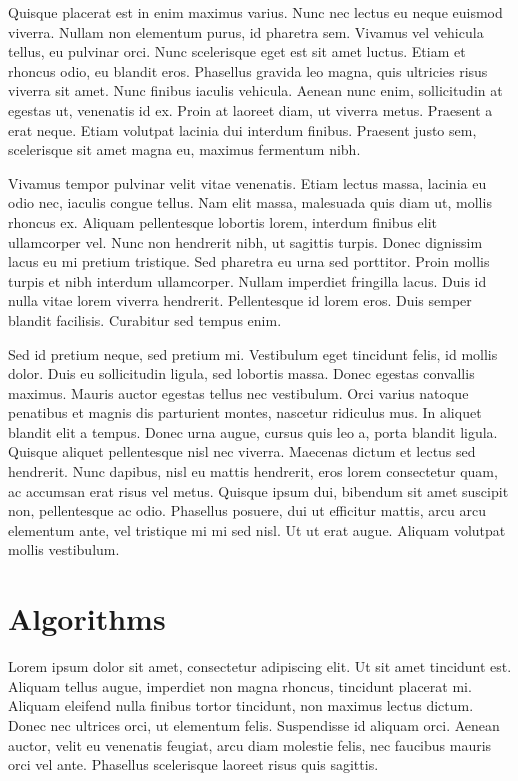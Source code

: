 \documentclass[conference]{IEEEtran}
\begin{document}
Quisque placerat est in enim maximus varius. Nunc nec lectus eu neque euismod viverra. Nullam non elementum purus, id pharetra sem. Vivamus vel vehicula tellus, eu pulvinar orci. Nunc scelerisque eget est sit amet luctus. Etiam et rhoncus odio, eu blandit eros. Phasellus gravida leo magna, quis ultricies risus viverra sit amet. Nunc finibus iaculis vehicula. Aenean nunc enim, sollicitudin at egestas ut, venenatis id ex. Proin at laoreet diam, ut viverra metus. Praesent a erat neque. Etiam volutpat lacinia dui interdum finibus. Praesent justo sem, scelerisque sit amet magna eu, maximus fermentum nibh.

Vivamus tempor pulvinar velit vitae venenatis. Etiam lectus massa, lacinia eu odio nec, iaculis congue tellus. Nam elit massa, malesuada quis diam ut, mollis rhoncus ex. Aliquam pellentesque lobortis lorem, interdum finibus elit ullamcorper vel. Nunc non hendrerit nibh, ut sagittis turpis. Donec dignissim lacus eu mi pretium tristique. Sed pharetra eu urna sed porttitor. Proin mollis turpis et nibh interdum ullamcorper. Nullam imperdiet fringilla lacus. Duis id nulla vitae lorem viverra hendrerit. Pellentesque id lorem eros. Duis semper blandit facilisis. Curabitur sed tempus enim.

Sed id pretium neque, sed pretium mi. Vestibulum eget tincidunt felis, id mollis dolor. Duis eu sollicitudin ligula, sed lobortis massa. Donec egestas convallis maximus. Mauris auctor egestas tellus nec vestibulum. Orci varius natoque penatibus et magnis dis parturient montes, nascetur ridiculus mus. In aliquet blandit elit a tempus. Donec urna augue, cursus quis leo a, porta blandit ligula. Quisque aliquet pellentesque nisl nec viverra. Maecenas dictum et lectus sed hendrerit. Nunc dapibus, nisl eu mattis hendrerit, eros lorem consectetur quam, ac accumsan erat risus vel metus. Quisque ipsum dui, bibendum sit amet suscipit non, pellentesque ac odio. Phasellus posuere, dui ut efficitur mattis, arcu arcu elementum ante, vel tristique mi mi sed nisl. Ut ut erat augue. Aliquam volutpat mollis vestibulum. 

\section{Algorithms}

Lorem ipsum dolor sit amet, consectetur adipiscing elit. Ut sit amet tincidunt est. Aliquam tellus augue, imperdiet non magna rhoncus, tincidunt placerat mi. Aliquam eleifend nulla finibus tortor tincidunt, non maximus lectus dictum. Donec nec ultrices orci, ut elementum felis. Suspendisse id aliquam orci. Aenean auctor, velit eu venenatis feugiat, arcu diam molestie felis, nec faucibus mauris orci vel ante. Phasellus scelerisque laoreet risus quis sagittis.
\end{document}

